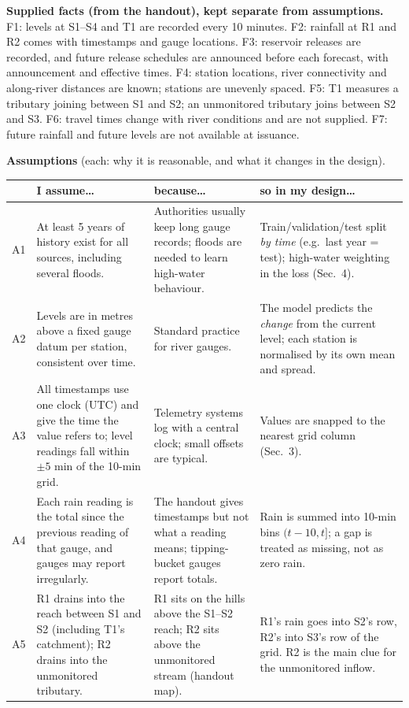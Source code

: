 \textbf{Supplied facts (from the handout), kept separate from assumptions.}
F1: levels at S1--S4 and T1 are recorded every 10 minutes. F2: rainfall at R1 and R2 comes with timestamps and gauge locations. F3: reservoir releases are recorded, and future release schedules are announced before each forecast, with announcement and effective times. F4: station locations, river connectivity and along-river distances are known; stations are unevenly spaced. F5: T1 measures a tributary joining between S1 and S2; an unmonitored tributary joins between S2 and S3. F6: travel times change with river conditions and are not supplied. F7: future rainfall and future levels are not available at issuance.

\textbf{Assumptions} (each: why it is reasonable, and what it changes in the design).

\begin{longtable}{@{}p{0.6cm}p{4.9cm}p{5.0cm}p{4.9cm}@{}}
\toprule
& \textbf{I assume\ldots} & \textbf{because\ldots} & \textbf{so in my design\ldots}\\
\midrule\endhead
A1 & At least 5 years of history exist for all sources, including several floods. & Authorities usually keep long gauge records; floods are needed to learn high-water behaviour. & Train/validation/test split \emph{by time} (e.g.\ last year = test); high-water weighting in the loss (Sec.~4). \\
A2 & Levels are in metres above a fixed gauge datum per station, consistent over time. & Standard practice for river gauges. & The model predicts the \emph{change} from the current level; each station is normalised by its own mean and spread. \\
A3 & All timestamps use one clock (UTC) and give the time the value refers to; level readings fall within $\pm5$ min of the 10-min grid. & Telemetry systems log with a central clock; small offsets are typical. & Values are snapped to the nearest grid column (Sec.~3). \\
A4 & Each rain reading is the total since the previous reading of that gauge, and gauges may report irregularly. & The handout gives timestamps but not what a reading means; tipping-bucket gauges report totals. & Rain is summed into 10-min bins $(t-10,t]$; a gap is treated as missing, not as zero rain. \\
A5 & R1 drains into the reach between S1 and S2 (including T1's catchment); R2 drains into the unmonitored tributary. & R1 sits on the hills above the S1--S2 reach; R2 sits above the unmonitored stream (handout map). & R1's rain goes into S2's row, R2's into S3's row of the grid. R2 is the main clue for the unmonitored inflow. \\

\end{longtable}
